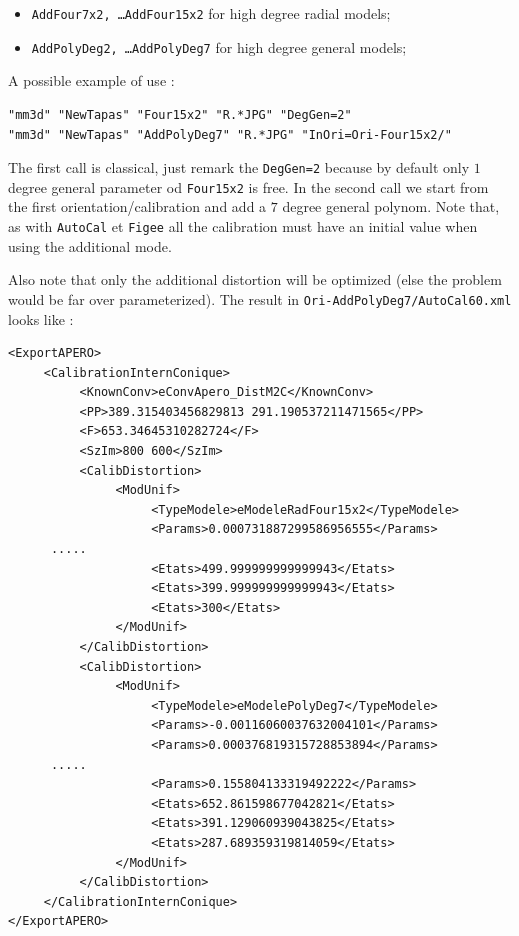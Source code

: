 \begin{itemize}
    \item  {\tt AddFour7x2,  \dots AddFour15x2} for high degree radial models;
    \item  {\tt AddPolyDeg2, \dots AddPolyDeg7} for high degree general models;
\end{itemize}

A possible example of use :

\begin{verbatim}
"mm3d" "NewTapas" "Four15x2" "R.*JPG" "DegGen=2"
"mm3d" "NewTapas" "AddPolyDeg7" "R.*JPG" "InOri=Ori-Four15x2/"
\end{verbatim}

The first call is classical, just remark the {\tt DegGen=2} because by default only $1$ degree
general parameter od {\tt Four15x2} is free.  In the second call we start from the first orientation/calibration
and add a $7$ degree general polynom. Note that, as with {\tt AutoCal} et {\tt Figee} all the calibration must have
an initial value when using the additional mode.

Also note that only the additional distortion will be optimized (else the problem would be far over parameterized).
The result in {\tt Ori-AddPolyDeg7/AutoCal60.xml} looks like :

{\tiny
\begin{verbatim}
<ExportAPERO>
     <CalibrationInternConique>
          <KnownConv>eConvApero_DistM2C</KnownConv>
          <PP>389.315403456829813 291.190537211471565</PP>
          <F>653.34645310282724</F>
          <SzIm>800 600</SzIm>
          <CalibDistortion>
               <ModUnif>
                    <TypeModele>eModeleRadFour15x2</TypeModele>
                    <Params>0.000731887299586956555</Params>
      .....
                    <Etats>499.999999999999943</Etats>
                    <Etats>399.999999999999943</Etats>
                    <Etats>300</Etats>
               </ModUnif>
          </CalibDistortion>
          <CalibDistortion>
               <ModUnif>
                    <TypeModele>eModelePolyDeg7</TypeModele>
                    <Params>-0.00116060037632004101</Params>
                    <Params>0.000376819315728853894</Params>
      .....
                    <Params>0.155804133319492222</Params>
                    <Etats>652.861598677042821</Etats>
                    <Etats>391.129060939043825</Etats>
                    <Etats>287.689359319814059</Etats>
               </ModUnif>
          </CalibDistortion>
     </CalibrationInternConique>
</ExportAPERO>

\end{verbatim}
}

